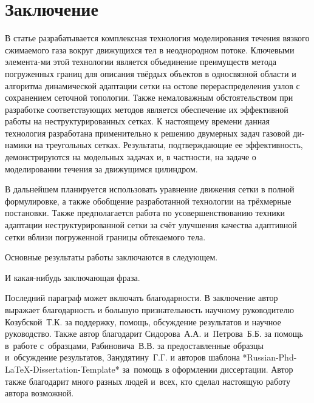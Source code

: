 \chapter*{Заключение}                       %
В статье разрабатывается комплексная технология моделирования течения вязкого сжимаемого газа вокруг движущихся тел в неоднородном потоке. Ключевыми элемента-ми этой технологии является объединение преимуществ метода погруженных границ для описания твёрдых объектов в односвязной области и алгоритма динамической адаптации сетки на остове перераспределения узлов с сохранением сеточной топологии. Также немаловажным обстоятельством при разработке соответствующих методов является обеспечение их эффективной работы на неструктурированных сетках. К настоящему времени данная технология разработана применительно к решению двумерных задач газовой ди-намики на треугольных сетках. Результаты, подтверждающие ее эффективность, демонстрируются на модельных задачах и, в частности, на задаче о моделировании течения за движущимся цилиндром.

В дальнейшем планируется использовать уравнение движения сетки в полной формулировке, а также обобщение разработанной технологии на трёхмерные постановки. Также предполагается работа по усовершенствованию техники адаптации неструктурированной сетки за счёт улучшения качества адаптивной сетки вблизи погруженной границы обтекаемого тела. 


Основные результаты работы заключаются в следующем.

И какая-нибудь заключающая фраза.

Последний параграф может включать благодарности.  В заключение автор
выражает благодарность и большую признательность научному руководителю
Козубской~Т.\:К. за поддержку, помощь, обсуждение результатов и научное
руководство. Также автор благодарит Сидорова~А.\:А. и~Петрова~Б.\:Б.
за помощь в~работе с~образцами, Рабиновича~В.\:В. за предоставленные
образцы и~обсуждение результатов, Занудятину~Г.\:Г. и авторов шаблона
*Russian-Phd-LaTeX-Dissertation-Template* за~помощь в оформлении
диссертации. Автор также благодарит много разных людей
и~всех, кто сделал настоящую работу автора возможной.

